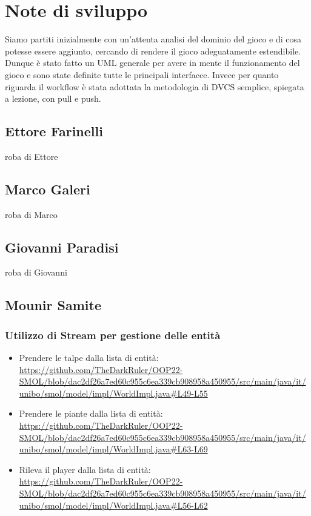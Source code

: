 \documentclass[a4paper,12pt]{report}
\begin{document}
\section{Note di sviluppo}
Siamo partiti inizialmente con un'attenta analisi del dominio del gioco e di cosa potesse essere aggiunto, cercando di rendere il gioco adeguatamente estendibile.
Dunque è stato fatto un UML generale per avere in mente il funzionamento del gioco e sono state definite tutte le principali interfacce.
Invece per quanto riguarda il workflow è stata adottata la metodologia di DVCS semplice, spiegata a lezione, con pull e push.
\subsection*{Ettore Farinelli}
roba di Ettore
\subsection*{Marco Galeri}
roba di Marco
\subsection*{Giovanni Paradisi}
roba di Giovanni
\subsection*{Mounir Samite}
\subsubsection*{Utilizzo di Stream per gestione delle entità}
\begin{itemize}
    \item Prendere le talpe dalla lista di entità: \url{https://github.com/TheDarkRuler/OOP22-SMOL/blob/dac2df26a7ed60c955c6ea339cb908958a450955/src/main/java/it/unibo/smol/model/impl/WorldImpl.java#L49-L55}
    \item Prendere le piante dalla lista di entità: \url{https://github.com/TheDarkRuler/OOP22-SMOL/blob/dac2df26a7ed60c955c6ea339cb908958a450955/src/main/java/it/unibo/smol/model/impl/WorldImpl.java#L63-L69}
    \item Rileva il player dalla lista di entità: \url{https://github.com/TheDarkRuler/OOP22-SMOL/blob/dac2df26a7ed60c955c6ea339cb908958a450955/src/main/java/it/unibo/smol/model/impl/WorldImpl.java#L56-L62}
\end{itemize}



\end{document}
